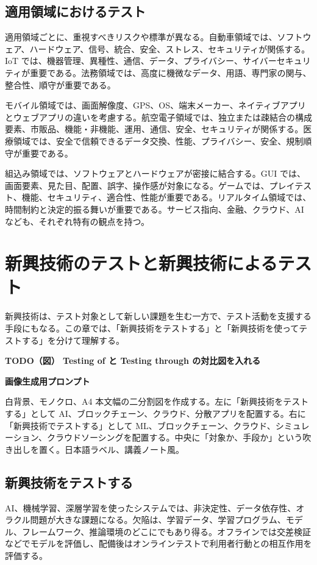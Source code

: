\documentclass[uplatex,dvipdfmx,a4paper,11pt,nomag]{jsarticle}
\newenvironment{todobox}[2]{\par\medskip\begin{framed}\noindent\textbf{TODO（図） #1}\par\smallskip\noindent\textbf{画像生成用プロンプト}\par\smallskip\noindent #2\par\smallskip}{\end{framed}\par\medskip}
\begin{document}
\subsection{適用領域におけるテスト}
適用領域ごとに、重視すべきリスクや標準が異なる。自動車領域では、ソフトウェア、ハードウェア、信号、統合、安全、ストレス、セキュリティが関係する。IoT では、機器管理、異種性、通信、データ、プライバシー、サイバーセキュリティが重要である。法務領域では、高度に機微なデータ、用語、専門家の関与、整合性、順守が重要である。

モバイル領域では、画面解像度、GPS、OS、端末メーカー、ネイティブアプリとウェブアプリの違いを考慮する。航空電子領域では、独立または疎結合の構成要素、市販品、機能・非機能、運用、通信、安全、セキュリティが関係する。医療領域では、安全で信頼できるデータ交換、性能、プライバシー、安全、規制順守が重要である。

組込み領域では、ソフトウェアとハードウェアが密接に結合する。GUI では、画面要素、見た目、配置、誤字、操作感が対象になる。ゲームでは、プレイテスト、機能、セキュリティ、適合性、性能が重要である。リアルタイム領域では、時間制約と決定的振る舞いが重要である。サービス指向、金融、クラウド、AI なども、それぞれ特有の観点を持つ。

\section{新興技術のテストと新興技術によるテスト}
新興技術は、テスト対象として新しい課題を生む一方で、テスト活動を支援する手段にもなる。この章では、「新興技術をテストする」と「新興技術を使ってテストする」を分けて理解する。

\begin{todobox}{Testing of と Testing through の対比図を入れる}{白背景、モノクロ、A4 本文幅の二分割図を作成する。左に「新興技術をテストする」として AI、ブロックチェーン、クラウド、分散アプリを配置する。右に「新興技術でテストする」として ML、ブロックチェーン、クラウド、シミュレーション、クラウドソーシングを配置する。中央に「対象か、手段か」という吹き出しを置く。日本語ラベル、講義ノート風。}
\end{todobox}

\subsection{新興技術をテストする}
AI、機械学習、深層学習を使ったシステムでは、非決定性、データ依存性、オラクル問題が大きな課題になる。欠陥は、学習データ、学習プログラム、モデル、フレームワーク、推論環境のどこにでもあり得る。オフラインでは交差検証などでモデルを評価し、配備後はオンラインテストで利用者行動との相互作用を評価する。
\end{document}

